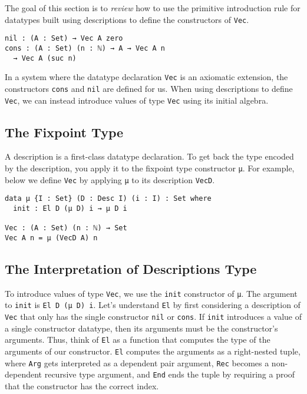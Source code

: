 \documentclass[preprint,nonatbib]{sigplanconf}
\begin{document}
The goal of this section is to {\it review} how to use the primitive
introduction rule for datatypes built using descriptions to define the
constructors of {\tt Vec}.

\begin{verbatim}
nil : (A : Set) → Vec A zero
cons : (A : Set) (n : ℕ) → A → Vec A n
  → Vec A (suc n)
\end{verbatim}

In a system where the datatype declaration {\tt Vec} is an axiomatic
extension, the constructors {\tt cons} and {\tt nil} are defined for
us. When using descriptions to define {\tt Vec}, we can instead
introduce values of type {\tt Vec} using its initial algebra.

\subsection{The Fixpoint Type}

A description is a first-class datatype declaration. To get back the
type encoded by the description, you apply it to the fixpoint type
constructor {\tt μ}. For example, below we define {\tt Vec} by
applying {\tt μ} to its description {\tt VecD}.

\begin{verbatim}
data μ {I : Set} (D : Desc I) (i : I) : Set where
  init : El D (μ D) i → μ D i

Vec : (A : Set) (n : ℕ) → Set
Vec A n = μ (VecD A) n
\end{verbatim}

\subsection{The Interpretation of Descriptions Type}
\label{sec:init:el}

To introduce values of type {\tt Vec}, we use the
{\tt init} constructor of {\tt μ}. The argument to {\tt init} is
{\tt El D (μ D) i}. Let's understand {\tt El} by first considering a
description of {\tt Vec} that only has the single constructor
{\tt nil} or {\tt cons}. If {\tt init} introduces
a value of a single constructor datatype, then its arguments must be
the constructor's arguments. Thus, think of
{\tt El} as a function that computes the type of the arguments of our
constructor. {\tt El} computes the arguments as a right-nested tuple,
where {\tt Arg} gets interpreted as a dependent pair argument,
{\tt Rec} becomes a non-dependent recursive type argument, and
{\tt End} ends the tuple by requiring a proof that the constructor has
the correct index.
\end{document}
